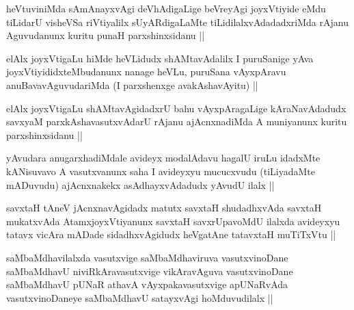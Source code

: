 \begin{artha}
heVtuviniMda sAmAnayxvAgi deVhAdigaLige beVreyAgi joyxVtiyide eMdu tiLidarU visheVSa riVtiyalilx sUyARdigaLaMte tiLidilalxvAdadadxriMda rAjanu Aguvudanunx kuritu punaH parxshinxsidanu ||
\end{artha}

\begin{artha}
elAlx joyxVtigaLu hiMde heVLidudx shAMtavAdalilx I puruSanige yAva joyxVtiyididxteMbudanunx nanage heVLu, puruSana vAyxpAravu anuBavavAguvudariMda (I parxshenxge avakAshavAyitu) ||
\end{artha}

\begin{artha}
elAlx joyxVtigaLu shAMtavAgidadxrU bahu vAyxpAragaLige kAraNavAdadudx savxyaM parxkAshavasutxvAdarU rAjanu ajAcnxnadiMda A muniyanunx kuritu parxshinxsidanu ||
\end{artha}

\begin{artha}
yAvudara anugarxhadiMdale avideyx modalAdavu hagalU iruLu idadxMte kANisuvavo A vasutxvanunx saha I avideyxyu mucucxvudu (tiLiyadaMte mADuvudu) ajAcnxnakekx asAdhayxvAdadudx yAvudU ilalx ||
\end{artha}

\begin{artha}
savxtaH tAneV jAcnxnavAgidadx matutx savxtaH shudadhxvAda savxtaH mukatxvAda AtamxjoyxVtiyanunx savxtaH savxrUpavoMdU ilalxda avideyxyu tatavx vicAra mADade sidadhxvAgidudx heVgatAne tatavxtaH muTiTxVtu ||
\end{artha}

\begin{artha}
saMbaMdhavilalxda vasutxvige saMbaMdhaviruva vasutxvinoDane saMbaMdhavU niviRkAravasutxvige vikAravAguva vasutxvinoDane saMbaMdhavU pUNaR athavA vAyxpakavasutxvige apUNaRvAda vasutxvinoDaneye saMbaMdhavU satayxvAgi hoMduvudilalx ||
\end{artha}


